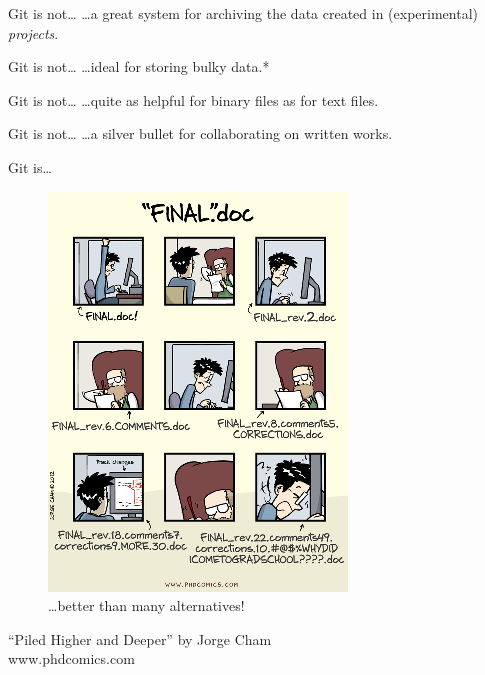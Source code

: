 \begin{frame}{Git is not\ldots}
  \hangindent=30pt \Huge {
  \ldots a great system for archiving the data created in (experimental)
  \emph{projects}.
  }
\end{frame}

\begin{frame}{Git is not\ldots}
  \hangindent=30pt \Huge {
  \ldots ideal for storing bulky data.*
  }
\end{frame}

\begin{frame}{Git is not\ldots}
  \hangindent=30pt \Huge {
  \ldots quite as helpful for binary files as for text files.
  }
\end{frame}

\begin{frame}{Git is not\ldots}
  \hangindent=30pt \Huge {
  \ldots a silver bullet for collaborating on written works.
  }
\end{frame}

\begin{frame}{Git is\ldots}
  \begin{figure}
    \includegraphics[scale=0.5]{phd101212s.png}
    \\ \ldots better than many alternatives!
  \end{figure}
  \footnotesize{``Piled Higher and Deeper'' by Jorge Cham\\
    www.phdcomics.com}

\end{frame}


